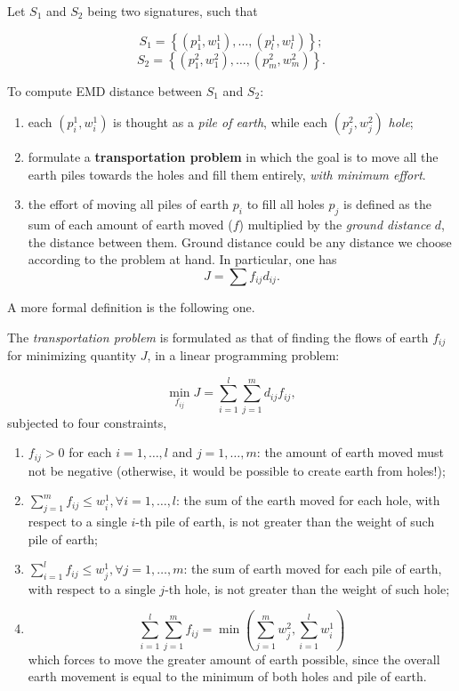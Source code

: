 \documentclass[10pt]{report}
\begin{document}
Let \(S_1\) and \(S_2\) being two signatures, such that

\[S_1 = \left\{(p_1^1, w_1^1),\dots,(p_l^1,w_l^1)\right\};\]
\[S_2 = \left\{(p_1^2, w_1^2),\dots,(p_m^2,w_m^2)\right\}.\]

To compute EMD distance between \(S_1\) and \(S_2\):

\begin{enumerate}
\item each \((p_i^1, w_i^1)\) is thought as a \emph{pile of earth}, while each
\((p_j^2, w_j^2)\) \emph{hole};
\item formulate a \textbf{transportation problem} in which the goal is to move all
the earth piles towards the holes and fill them entirely, \emph{with
minimum effort}.
\item the effort of moving all piles of earth \(p_i\) to fill all holes
\(p_j\) is defined as the sum of each amount of earth moved (\(f\))
multiplied by the \emph{ground distance} \(d\), the distance between them.
Ground distance could be any distance we choose according to the
problem at hand. In particular, one has \[J = \sum f_{ij}d_{ij}.\]
\end{enumerate}

A more formal definition is the following one.

The \emph{transportation problem} is formulated as that of finding the flows
of earth \(f_{ij}\) for minimizing quantity \(J\), in a linear
programming problem:

\[\min_{f_{ij}} J = \sum_{i=1}^l \sum_{j=1}^m d_{ij} f_{ij},\] subjected
to four constraints,

\begin{enumerate}
\item \(f_{ij} > 0\) for each \(i=1,\dots,l\) and \(j = 1,\dots,m\): the
amount of earth moved must not be negative (otherwise, it would be
possible to create earth from holes!);
\item \(\sum_{j=1}^m f_{ij} \leq w_i^1, \forall i = 1,\dots,l\): the sum of
the earth moved for each hole, with respect to a single \(i\)-th pile
of earth, is not greater than the weight of such pile of earth;
\item \(\sum_{i=1}^l f_{ij} \leq w_j^1, \forall j = 1,\dots,m\): the sum of
earth moved for each pile of earth, with respect to a single \(j\)-th
hole, is not greater than the weight of such hole;
\item \[\sum_{i=1}^l \sum_{j=1}^m f_{ij} = \min \left(\sum_{j=1}^m w_j^2, \sum_{i=1}^l w_i^1\right)\]
which forces to move the greater amount of earth possible, since the
overall earth movement is equal to the minimum of both holes and pile
of earth.
\end{enumerate}
\end{document}
